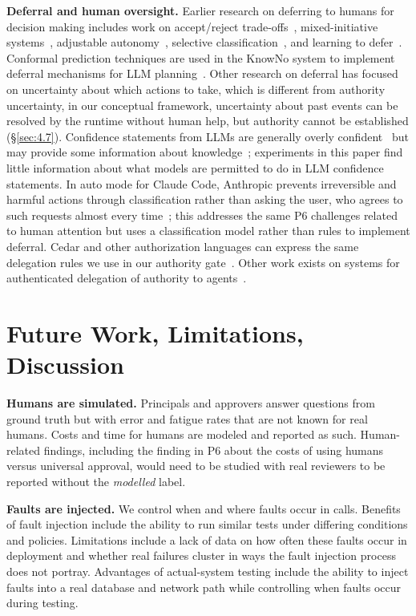 \documentclass[letterpaper,twocolumn,10pt]{article}
\begin{document}
\textbf{Deferral and human oversight.} Earlier research on deferring to humans for decision making includes work on accept/reject trade-offs~\cite{chow1970reject}, mixed-initiative systems~\cite{horvitz1999principles,horvitz1999uncertainty}, adjustable autonomy~\cite{scerri2002adjustable}, selective classification~\cite{geifman2017selective}, and learning to defer~\cite{madras2018defer}. Conformal prediction techniques are used in the KnowNo system to implement deferral mechanisms for LLM planning~\cite{ren2023knowno}. Other research on deferral has focused on uncertainty about which actions to take, which is different from authority uncertainty, in our conceptual framework, uncertainty about past events can be resolved by the runtime without human help, but authority cannot be established (\S\ref{sec:4.7}). Confidence statements from LLMs are generally overly confident~\cite{xiong2024uncertainty} but may provide some information about knowledge~\cite{kadavath2022know}; experiments in this paper find little information about what models are permitted to do in LLM confidence statements. In auto mode for Claude Code, Anthropic prevents irreversible and harmful actions through classification rather than asking the user, who agrees to such requests almost every time~\cite{anthropic2026automode}; this addresses the same P6 challenges related to human attention but uses a classification model rather than rules to implement deferral. Cedar and other authorization languages can express the same delegation rules we use in our authority gate~\cite{cutler2024cedar}. Other work exists on systems for authenticated delegation of authority to agents~\cite{south2025delegation}.

\section{Future Work, Limitations, Discussion}\label{sec:9}

\textbf{Humans are simulated.} Principals and approvers answer questions from ground truth but with error and fatigue rates that are not known for real humans. Costs and time for humans are modeled and reported as such. Human-related findings, including the finding in P6 about the costs of using humans versus universal approval, would need to be studied with real reviewers to be reported without the \emph{modelled} label.

\textbf{Faults are injected.} We control when and where faults occur in calls. Benefits of fault injection include the ability to run similar tests under differing conditions and policies. Limitations include a lack of data on how often these faults occur in deployment and whether real failures cluster in ways the fault injection process does not portray. Advantages of actual-system testing include the ability to inject faults into a real database and network path while controlling when faults occur during testing.
\end{document}
